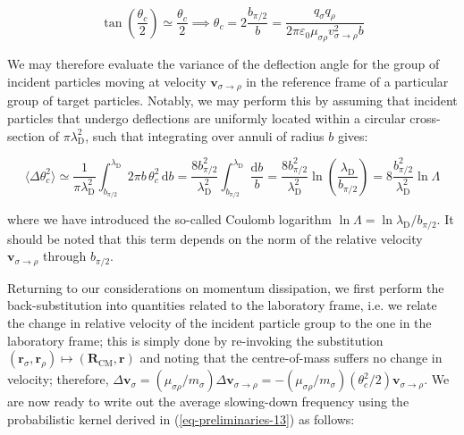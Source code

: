 \begin{equation}
    \tan\left(\frac{\theta_c}{2}\right)\simeq\frac{\theta_c}{2}\implies\theta_c=2\frac{b_{\pi/2}}{b}=\frac{q_\sigma q_\rho}{2\pi\varepsilon_0\mu_{\sigma\rho}v_{\sigma\to\rho}^2b}
\end{equation}

We may therefore evaluate the variance of the deflection angle for the group of incident particles moving at velocity $\mathbf{v}_{\sigma\to\rho}$ in the reference frame of a particular group of target particles. Notably, we may perform this by assuming that incident particles that undergo deflections are uniformly located within a circular cross-section of $\pi\lambda_{\mathrm{D}}^2$, such that integrating over annuli of radius $b$ gives:

\begin{equation*}
    \langle\Delta\theta_c^2\rangle\simeq\frac{1}{\pi\lambda_{\mathrm{D}}^2}\int_{b_{\pi/2}}^{\lambda_{\mathrm{D}}}2\pi b\,\theta_c^2\,\mathrm{d}b=\frac{8b_{\pi/2}^2}{\lambda_{\mathrm{D}}^2}\int_{b_{\pi/2}}^{\lambda_{\mathrm{D}}}\frac{\mathrm{d}b}{b}=\frac{8b_{\pi/2}^2}{\lambda_{\mathrm{D}}^2}\ln{\left(\frac{\lambda_{\mathrm{D}}}{b_{\pi/2}}\right)}=8 \frac{b_{\pi/2}^2}{\lambda_{\mathrm{D}}^2}\ln{\Lambda}
\end{equation*}

where we have introduced the so-called Coulomb logarithm $\ln{\Lambda}=\ln{\lambda_{\mathrm{D}}/b_{\pi/2}}$. It should be noted that this term depends on the norm of the relative velocity $\mathbf{v}_{\sigma\to\rho}$ through $b_{\pi/2}$. 

\vspace*{2.5pt}

\quad Returning to our considerations on momentum dissipation, we first perform the back-substitution into quantities related to the laboratory frame, i.e. we relate the change in relative velocity of the incident particle group to the one in the laboratory frame; this is simply done by re-invoking the substitution $(\mathbf{r}_\sigma,\mathbf{r}_\rho)\mapsto(\mathbf{R}_{\mathrm{CM}}, \mathbf{r})$ and noting that the centre-of-mass suffers no change in velocity; therefore, $\Delta \mathbf{v}_\sigma=\left({\mu_{\sigma\rho}}/{m_\sigma}\right)\Delta \mathbf{v}_{\sigma\to\rho}=-\left({\mu_{\sigma\rho}}/{m_\sigma}\right)\left(\theta_c^2/2\right)\mathbf{v}_{\sigma\to\rho}$. We are now ready to write out the average slowing-down frequency using the probabilistic kernel derived in (\ref{eq-preliminaries-13}) as follows:

